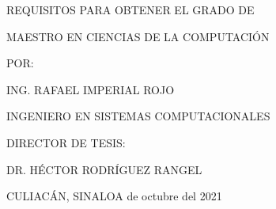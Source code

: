 \begin{titlepage}
\begin{center}
        \vspace{-0.2cm}
        
        {\fontsize{11}{30}\selectfont {} REQUISITOS PARA OBTENER EL GRADO DE}
        
        \vspace{0.5cm}
        {\fontsize{14}{30}\selectfont MAESTRO EN CIENCIAS DE LA COMPUTACIÓN}
        
        
        \vspace{0.5cm}
        
        {\fontsize{14}{30}\selectfont POR:}
        
        \vspace{0.5cm}
        {\fontsize{11}{30}\selectfont ING. RAFAEL IMPERIAL ROJO}
        
        
        {\fontsize{14}{30}\selectfont INGENIERO EN SISTEMAS COMPUTACIONALES }
        
        
        \vspace{0.5cm}
        {\fontsize{14}{30}\selectfont DIRECTOR DE TESIS:}
        
        {\fontsize{11}{30}\selectfont DR. HÉCTOR RODRÍGUEZ RANGEL}
        
        \vspace{2.5cm}
        {\fontsize{14}{30}\selectfont CULIACÁN, SINALOA} \hfill {\fontsize{14}{30} de octubre del 2021}
        
        
    \end{center}

\end{titlepage}